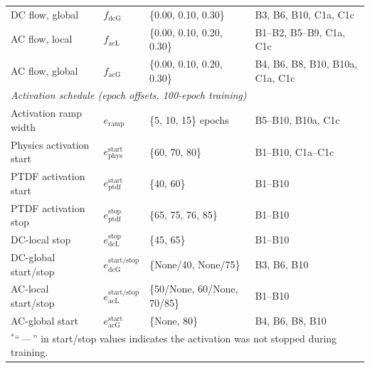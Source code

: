 \begin{table}[htbp]
\begin{tabular}{llll}
    DC flow, global         & $f_\text{dcG}$     & \{0.00, 0.10, 0.30\}     & B3, B6, B10, C1a, C1c \\
    AC flow, local          & $f_\text{acL}$     & \{0.00, 0.10, 0.20, 0.30\} & B1–B2, B5–B9, C1a, C1c \\
    AC flow, global         & $f_\text{acG}$     & \{0.00, 0.10, 0.20, 0.30\} & B4, B6, B8, B10, B10a, C1a, C1c \\
    \midrule
    \multicolumn{4}{l}{\textit{Activation schedule (epoch offsets, 100-epoch training)}} \\[2pt]
    Activation ramp width   & $e_\text{ramp}$        & \{5, 10, 15\} epochs           & B5–B10, B10a, C1c \\
    Physics activation start & $e^\text{start}_\text{phys}$  & \{60, 70, 80\}          & B1–B10, C1a–C1c \\
    PTDF activation start   & $e^\text{start}_\text{ptdf}$  & \{40, 60\}               & B1–B10 \\
    PTDF activation stop    & $e^\text{stop}_\text{ptdf}$   & \{65, 75, 76, 85\}       & B1–B10 \\
    DC-local stop           & $e^\text{stop}_\text{dcL}$    & \{45, 65\}               & B1–B10 \\
    DC-global start/stop    & $e^\text{start/stop}_\text{dcG}$ & \{None/40, None/75\}  & B3, B6, B10 \\
    AC-local start/stop     & $e^\text{start/stop}_\text{acL}$ & \{50/None, 60/None, 70/85\} & B1–B10 \\
    AC-global start         & $e^\text{start}_\text{acG}$   & \{None, 80\}             & B4, B6, B8, B10 \\
    \bottomrule
    \multicolumn{4}{l}{\footnotesize $^{*}$``\,---\,'' in start/stop values indicates the activation was not stopped during training.} \\
  \end{tabular}
\end{table}

